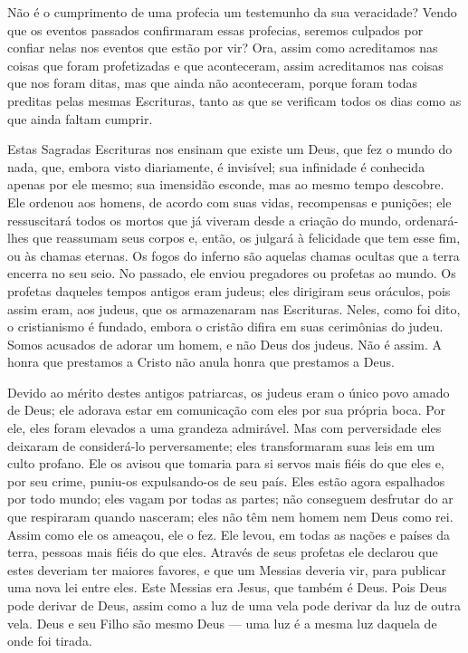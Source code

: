 \documentclass[11pt,a5paper,twoside,openany]{book}
\begin{document}
Não é o cumprimento de uma profecia um testemunho da sua veracidade? Vendo que os eventos passados ​​confirmaram essas profecias, seremos culpados por confiar nelas nos eventos que estão por vir? Ora, assim como acreditamos nas coisas que foram profetizadas e que aconteceram, assim acreditamos nas coisas que nos foram ditas, mas que ainda não aconteceram, porque foram todas preditas pelas mesmas Escrituras, tanto as que se verificam todos os dias como as que ainda faltam cumprir.

Estas Sagradas Escrituras nos ensinam que existe um Deus, que fez o mundo do nada, que, embora visto diariamente, é invisível; sua infinidade é conhecida apenas por ele mesmo; sua imensidão esconde, mas ao mesmo tempo descobre. Ele ordenou aos homens, de acordo com suas vidas, recompensas e punições; ele ressuscitará todos os mortos que já viveram desde a criação do mundo, ordenará-lhes que reassumam seus corpos e, então, os julgará à felicidade que tem esse fim, ou às chamas eternas. Os fogos do inferno são aquelas chamas ocultas que a terra encerra no seu seio. No passado, ele enviou pregadores ou profetas ao mundo. Os profetas daqueles tempos antigos eram judeus; eles dirigiram seus oráculos, pois assim eram, aos judeus, que os armazenaram nas Escrituras. Neles, como foi dito, o cristianismo é fundado, embora o cristão difira em suas cerimônias do judeu. Somos acusados ​​de adorar um homem, e não Deus dos judeus. Não é assim. A honra que prestamos a Cristo não anula honra que prestamos a Deus.

Devido ao mérito destes antigos patriarcas, os judeus eram o único povo amado de Deus; ele adorava estar em comunicação com eles por sua própria boca. Por ele, eles foram elevados a uma grandeza admirável. Mas com perversidade eles deixaram de considerá-lo perversamente; eles transformaram suas leis em um culto profano. Ele os avisou que tomaria para si servos mais fiéis do que eles e, por seu crime, puniu-os expulsando-os de seu país. Eles estão agora espalhados por todo mundo; eles vagam por todas as partes; não conseguem desfrutar do ar que respiraram quando nasceram; eles não têm nem homem nem Deus como rei. Assim como ele os ameaçou, ele o fez. Ele levou, em todas as nações e países da terra, pessoas mais fiéis do que eles. Através de seus profetas ele declarou que estes deveriam ter maiores favores, e que um Messias deveria vir, para publicar uma nova lei entre eles. Este Messias era Jesus, que também é Deus. Pois Deus pode derivar de Deus, assim como a luz de uma vela pode derivar da luz de outra vela. Deus e seu Filho são mesmo Deus — uma luz é a mesma luz daquela de onde foi tirada.
\end{document}
